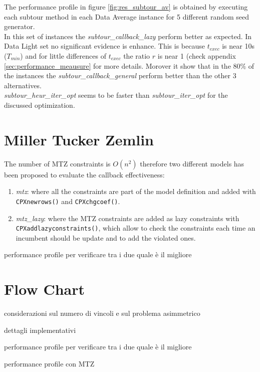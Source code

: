 The performance profile in figure \ref{fig:res_subtour_av} is obtained by executing each subtour method in each Data Average instance for 5 different random seed generator. \\
In this set of instances the \textit{subtour\_callback\_lazy} perform better as expected. In Data Light set no significant evidence is enhance. This is because $ t_{exec} $ is near 10s ($ T_{min} $) and for little differences of $ t_{exec} $ the ratio $ r $ is near 1 (check appendix \ref{sec:performance_meausure} for more details.
Morover it show that in the $ 80\%  $  of the instances the \textit{subtour\_callback\_general} perform better than the other 3 alternatives.\\
\textit{subtour\_heur\_iter\_opt} seems to be faster than \textit{subtour\_iter\_opt} for the discussed optimization. 


\section{Miller Tucker Zemlin}
The number of MTZ constraints is $O(n^2)$ therefore two different models has been proposed to evaluate the callback effectiveness:
\begin{enumerate}
	\item \textit{mtz}: where all the constraints are part of the model definition and added with \texttt{CPXnewrows()} and \texttt{CPXchgcoef()}. 
	\item \textit{mtz\_lazy}: where the MTZ constraints are added as lazy constraints with \texttt{CPXaddlazyconstraints()}, which allow to check the constraints each time an incumbent should be update and to add the violated ones.
\end{enumerate}

performance profile per verificare tra i due quale è il migliore


\section{Flow Chart}


considerazioni sul numero di vincoli e sul problema asimmetrico

dettagli implementativi

performance profile per verificare tra i due quale è il migliore

performance profile con MTZ
